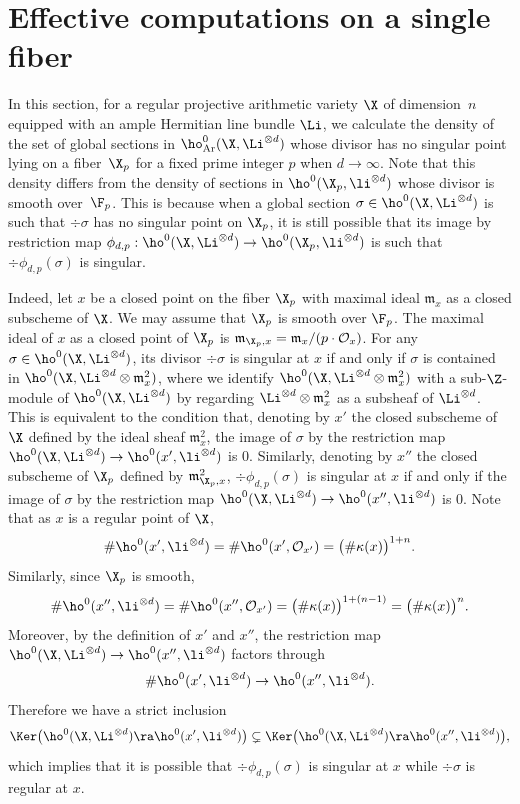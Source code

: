 \section{Effective computations on a single fiber}\label{effective}

In this section, for a regular projective arithmetic variety $\X$ of dimension~$n$ equipped with an ample Hermitian line bundle $\Li$, we calculate the density of the set of global sections in $\ho^0_{\mathrm{Ar}}(\X, \Li^{\otimes d})$ whose divisor has no singular point lying on a fiber~$\X_p$ for a fixed prime integer $p$ when $d\to \infty$. Note that this density differs from the density of sections in $\ho^0(\X_p, \li^{\otimes d})$ whose divisor is smooth over~$\F_p$. This is because when a global section $\sigma \in \ho^0(\X, \Li^{\otimes d})$ is such that $\div \sigma$ has no singular point on $\X_p$, it is still possible that its image by restriction map $\phi_{d,p}: \ho^0(\X, \Li^{\otimes d})\to \ho^0(\X_p, \li^{\otimes d})$ is such that $\div \phi_{d,p}(\sigma)$ is singular.

Indeed, let $x$ be a closed point on the fiber $\X_p$ with maximal ideal $\mathfrak{m}_x$ as a closed subscheme of $\X$. We may assume that $\X_p$ is smooth over $\F_p$. The maximal ideal of $x$ as a closed point of $\X_p$ is $\mathfrak{m}_{\X_p,x}=\mathfrak{m}_x/(p\cdot\mathcal{O}_x)$. For any $\sigma\in \ho^0(\X,\Li^{\otimes d})$, its divisor $\div \sigma$ is singular at $x$ if and only if $\sigma$ is contained in $\ho^0(\X, \Li^{\otimes d}\otimes \mathfrak{m}_{x}^2)$, where we identify $\ho^0(\X, \Li^{\otimes d}\otimes \mathfrak{m}_{x}^2)$ with a sub-$\Z$-module of $\ho^0(\X,\Li^{\otimes d})$ by regarding $\Li^{\otimes d}\otimes \mathfrak{m}_{x}^2$ as a subsheaf of $\Li^{\otimes d}$. This is equivalent to the condition that, denoting by $x'$ the closed subscheme of $\X$ defined by the ideal sheaf $\mathfrak{m}_x^2$, the image of $\sigma$ by the restriction map $\ho^0(\X, \Li^{\otimes d})\to \ho^0(x', \li^{\otimes d})$ is $0$. Similarly, denoting by $x''$ the closed subscheme of $\X_p$ defined by $\mathfrak{m}_{\X_p,x}^2$, $\div \phi_{d,p}(\sigma)$ is singular at $x$ if and only if the image of $\sigma$ by the restriction map $\ho^0(\X, \Li^{\otimes d})\to \ho^0(x'', \li^{\otimes d})$ is $0$. Note that as $x$ is a regular point of $\X$,
\[
\#\ho^0(x', \li^{\otimes d})=\#\ho^0(x', \mathcal{O}_{x'})=\big(\#\kappa(x)\big)^{1+n}.
\]
Similarly, since $\X_p$ is smooth,
\[
\#\ho^0(x'', \li^{\otimes d})=\#\ho^0(x'', \mathcal{O}_{x'})=\big(\#\kappa(x)\big)^{1+(n-1)}=\big(\#\kappa(x)\big)^n.
\]
Moreover, by the definition of $x'$ and $x''$, the restriction map $\ho^0(\X, \Li^{\otimes d})\to \ho^0(x'', \li^{\otimes d})$ factors through
\[
\#\ho^0(x', \li^{\otimes d})\to \ho^0(x'', \li^{\otimes d}).
\]
Therefore we have a strict inclusion
\[
\Ker\bigl(\ho^0(\X, \Li^{\otimes d})\ra \ho^0(x', \li^{\otimes d}) \bigr) \subsetneq \Ker\bigl(\ho^0(\X, \Li^{\otimes d})\ra \ho^0(x'', \li^{\otimes d})\bigr),
\]
which implies that it is possible that $\div \phi_{d,p}(\sigma)$ is singular at $x$ while $\div \sigma$ is regular at $x$.

